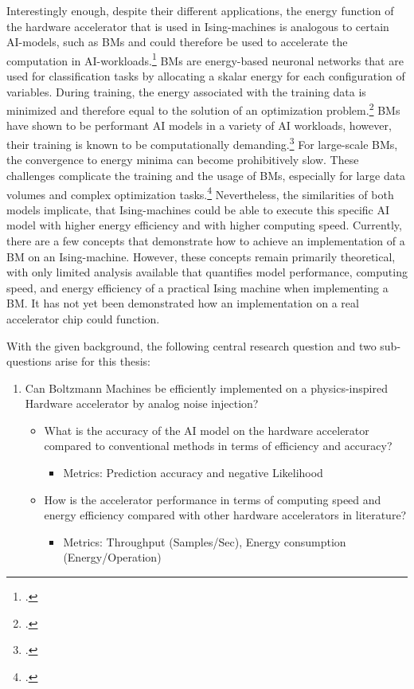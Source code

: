 Interestingly enough, despite their different applications, the energy function of the hardware accelerator that is used
in Ising-machines is analogous to certain AI-models, such as \ac{BM}s and could therefore be used to accelerate the computation in AI-workloads.\footcite[cf.][10]{caiHarnessingIntrinsicNoise2019}
\ac{BM}s are energy-based neuronal networks that are used for classification tasks by 
allocating a skalar energy for each configuration of variables.
During training, the energy associated with the training data is minimized and therefore equal to the solution of an optimization problem.\footcite[cf.][2]{nazmbojnordiMemristiveBoltzmannMachine2016} 
\ac{BM}s have shown to be performant AI models in a variety of AI workloads, however, their training is known to be computationally demanding.\footcite[cf.][1]{nazmbojnordiMemristiveBoltzmannMachine2016} 
For large-scale \ac{BM}s, the convergence to energy minima can become prohibitively slow.
These challenges complicate the training and the usage of \ac{BM}s, especially for large data volumes and complex optimization tasks.\footcite[cf.][2]{nazmbojnordiMemristiveBoltzmannMachine2016} 
Nevertheless, the similarities of both models implicate, that Ising-machines could be able to execute this 
specific AI model with higher energy efficiency and with higher computing speed.
Currently, there are a few concepts that demonstrate how to achieve an implementation of a \ac{BM} on an Ising-machine.
However, these concepts remain primarily theoretical, with only limited analysis available that quantifies model performance, computing speed, and energy efficiency of a practical Ising machine when implementing a \ac{BM}.
It has not yet been demonstrated how an implementation on a real accelerator chip could function.

With the given background, the following central research question and two sub-questions arise for this thesis:
\begin{enumerate}
    \item Can Boltzmann Machines be efficiently implemented on a physics-inspired Hardware accelerator by analog noise injection?
        \begin{itemize}
            \item What is the accuracy of the AI model on the hardware accelerator compared to conventional methods in terms of efficiency and accuracy?
                \begin{itemize}
                    \item Metrics: Prediction accuracy and negative Likelihood
                \end{itemize}
            \item How is the accelerator performance in terms of computing speed and energy efficiency compared with other hardware accelerators in literature?
                \begin{itemize}
                    \item Metrics: Throughput (Samples/Sec), Energy consumption (Energy/Operation)
                \end{itemize}
        \end{itemize}  
\end{enumerate}

